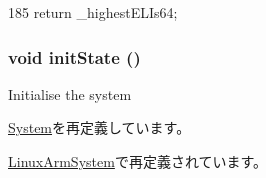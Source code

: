 \begin{DoxyCode}
185 { return _highestELIs64; }
\end{DoxyCode}
\hypertarget{classArmSystem_a3c34ea9b29f410748d4435a667484924}{
\subsubsection[{initState}]{\setlength{\rightskip}{0pt plus 5cm}void initState ()}}
\label{classArmSystem_a3c34ea9b29f410748d4435a667484924}
Initialise the system 

\hyperlink{classSystem_a3c34ea9b29f410748d4435a667484924}{System}を再定義しています。

\hyperlink{classLinuxArmSystem_a3c34ea9b29f410748d4435a667484924}{LinuxArmSystem}で再定義されています。


